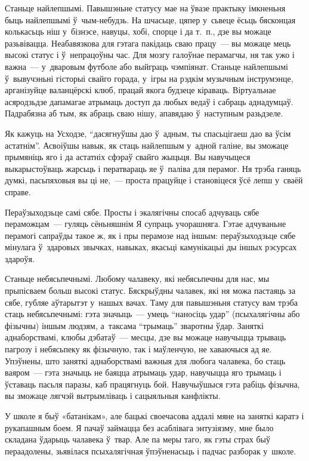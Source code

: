 Станьце найлепшымі. Павышэньне статусу мае на ўвазе практыку імкненьня быць найлепшымі ў~чым-небудзь. На шчасьце, цяпер у~сьвеце ёсьць бясконцая колькасьць ніш у~бізнэсе, навуцы, хобі, спорце і да т.~п., дзе вы можаце разьвівацца. Неабавязкова для гэтага пакідаць сваю працу~--- вы можаце мець высокі статус і ў~непрацоўны час. Для мозгу галоўнае перамагчы, ня так ужо і важна~--- у~дваровым футболе або выйграць чэмпіянат. Станьце найлепшымі ў~вывучэньні гісторыі свайго горада, у~ігры на рэдкім музычным інструмэнце, арганізуйце валанцёрскі клюб, працай якога будзеце кіраваць. Віртуальнае асяродзьдзе дапамагае атрымаць доступ да любых ведаў і сабраць аднадумцаў. Падрабязна аб тым, як абраць сваю нішу, апавядаю ў~наступным разьдзеле.

Як кажуць на Усходзе, ``дасягнуўшы дао ў~адным, ты спасьцігаеш дао ва ўсім астатнім''. Асвоіўшы навык, як стаць найлепшым у~адной галіне, вы зможаце прымяніць яго і да астатніх сфэраў свайго жыцьця. Вы навучыцеся выкарыстоўваць жарсьць і ператвараць яе ў~паліва для перамог. Ня трэба ганяць думкі, пасьпяховыя вы ці не,~--- проста працуйце і становіцеся ўсё лепш у~сваёй справе.

Пераўзыходзьце самі сябе. Просты і экалягічны спосаб адчуваць сябе пераможцам~--- гуляць сёньняшнім Я супраць учорашняга. Гэтае адчуваньне перамогі сапраўды такое ж, як і пры перамозе над іншым: пераўзыходзьце сябе мінулага ў~здаровых звычках, навыках, якасьці камунікацыі ды іншых рэсурсах здароўя.

Станьце небясьпечнымі. Любому чалавеку, які небясьпечны для нас, мы прыпісваем больш высокі статус. Бяскрыўдны чалавек, які ня можа пастаяць за сябе, губляе аўтарытэт у~нашых вачах. Таму для павышэньня статусу вам трэба стаць небясьпечнымі: гэта значыць~--- умець ``наносіць удар'' (псыхалягічны або фізычны) іншым людзям, а~таксама ``трымаць'' зваротны ўдар. Заняткі аднаборствамі, клюбы дэбатаў~--- месцы, дзе вы можаце навучыцца трываць пагрозу і небясьпеку як фізычную, так і маўленчую, не хаваючыся ад яе. Упэўнены, што заняткі аднаборствамі важныя для любога чалавека, бо стаць ваяром~--- гэта значыць не баяцца атрымаць удар, навучыцца яго трымаць і ўставаць пасьля паразы, каб працягнуць бой. Навучыўшыся гэта рабіць фізычна, вы зможаце лягчэй вытрымліваць і сацыяльныя канфлікты.

У школе я быў «батанікам», але бацькі своечасова аддалі мяне на заняткі каратэ і рукапашным боем. Я пачаў займацца без асаблівага энтузіязму, мне было складана ўдарыць чалавека ў~твар. Але па меры таго, як гэты страх быў пераадолены, зьявілася псыхалягічная ўпэўненасьць і падчас разборак у~школе.

